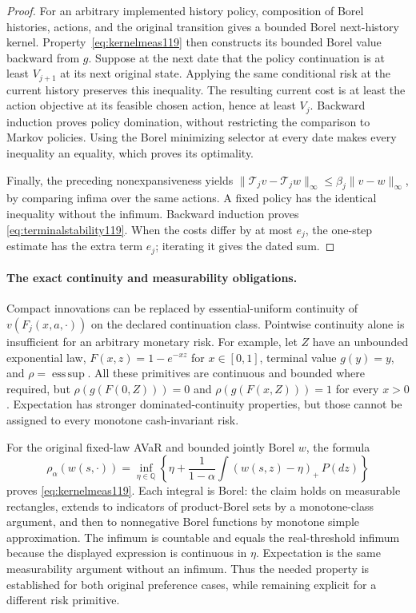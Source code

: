 \begin{proof}
For an arbitrary implemented history policy, composition of Borel
histories, actions, and the original transition gives a bounded Borel
next-history kernel.  Property~\eqref{eq:kernelmeas119} then
constructs its bounded Borel value backward from $g$.  Suppose at
the next date that the policy continuation is at least
$V_{j+1}$ at its next original state.  Applying the same conditional
risk at the current history preserves this inequality.  The resulting
current cost is at least the action objective at its feasible chosen
action, hence at least $V_j$.  Backward induction proves policy
domination, without restricting the comparison to Markov policies.
Using the Borel minimizing selector at every date makes every
inequality an equality, which proves its optimality.

Finally, the preceding nonexpansiveness yields
$\|\mathcal T_jv-\mathcal T_jw\|_\infty
\le\beta_j\|v-w\|_\infty$, by comparing infima over the same
actions.  A fixed policy has the identical inequality without the
infimum.  Backward induction proves
\eqref{eq:terminalstability119}.  When the costs differ by at
most $e_j$, the one-step estimate has the extra term $e_j$;
iterating it gives the dated sum.
\end{proof}

\paragraph{The exact continuity and measurability obligations.}
Compact innovations can be replaced by essential-uniform continuity
of $v(F_j(x,a,\cdot))$ on the declared continuation class.  Pointwise
continuity alone is insufficient for an arbitrary monetary risk.  For
example, let $Z$ have an unbounded exponential law,
$F(x,z)=1-e^{-xz}$ for $x\in[0,1]$, terminal value $g(y)=y$,
and $\rho=\operatorname{ess\,sup}$.  All these primitives are
continuous and bounded where required, but
$\rho(g(F(0,Z)))=0$ and $\rho(g(F(x,Z)))=1$ for every $x>0$.
Expectation has stronger dominated-continuity properties, but those
cannot be assigned to every monotone cash-invariant risk.

For the original fixed-law AVaR and bounded jointly Borel $w$, the
formula
\[
 \rho_\alpha(w(s,\cdot))=
 \inf_{\eta\in\mathbb Q}
 \left\{\eta+\frac1{1-\alpha}
                  \int(w(s,z)-\eta)_+\,P(dz)\right\}
\]
proves \eqref{eq:kernelmeas119}.  Each integral is Borel: the
claim holds on measurable rectangles, extends to indicators of
product-Borel sets by a monotone-class argument, and then to
nonnegative Borel functions by monotone simple approximation.
The infimum is countable and equals the real-threshold infimum
because the displayed expression is continuous in $\eta$.
Expectation is the same measurability argument without an infimum.
Thus the needed property is established for both original preference
cases, while remaining explicit for a different risk primitive.

